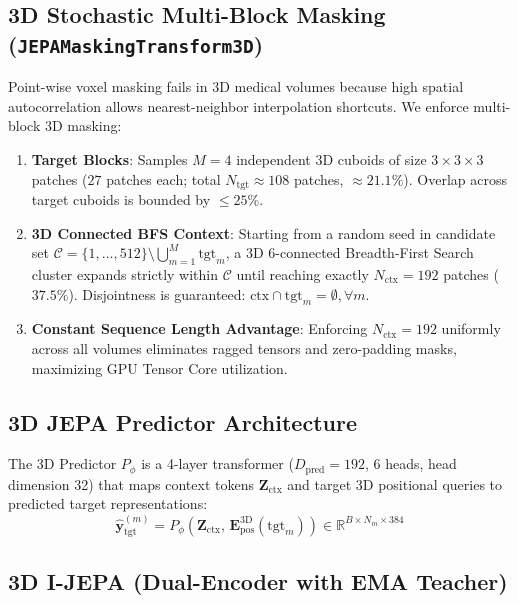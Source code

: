 \documentclass{article}
\begin{document}
\subsection{3D Stochastic Multi-Block Masking (\texttt{JEPAMaskingTransform3D})}

Point-wise voxel masking fails in 3D medical volumes because high spatial autocorrelation allows nearest-neighbor interpolation shortcuts. We enforce multi-block 3D masking:
\begin{enumerate}
    \item \textbf{Target Blocks}: Samples $M = 4$ independent 3D cuboids of size $3 \times 3 \times 3$ patches ($27$ patches each; total $N_{\text{tgt}} \approx 108$ patches, $\approx 21.1\%$). Overlap across target cuboids is bounded by $\le 25\%$.
    \item \textbf{3D Connected BFS Context}: Starting from a random seed in candidate set $\mathcal{C} = \{1, \dots, 512\} \setminus \bigcup_{m=1}^M \text{tgt}_m$, a 3D 6-connected Breadth-First Search cluster expands strictly within $\mathcal{C}$ until reaching exactly $N_{\text{ctx}} = 192$ patches ($37.5\%$). Disjointness is guaranteed: $\text{ctx} \cap \text{tgt}_m = \emptyset, \forall m$.
    \item \textbf{Constant Sequence Length Advantage}: Enforcing $N_{\text{ctx}} = 192$ uniformly across all volumes eliminates ragged tensors and zero-padding masks, maximizing GPU Tensor Core utilization.
\end{enumerate}

\subsection{3D JEPA Predictor Architecture}

The 3D Predictor $P_\phi$ is a 4-layer transformer ($D_{\text{pred}} = 192$, 6 heads, head dimension 32) that maps context tokens $\mathbf{Z}_{\text{ctx}}$ and target 3D positional queries to predicted target representations:
\begin{equation}
    \hat{\mathbf{y}}_{\text{tgt}}^{(m)} = P_\phi\left(\mathbf{Z}_{\text{ctx}}, \, \mathbf{E}_{\text{pos}}^{3\text{D}}(\text{tgt}_m)\right) \in \mathbb{R}^{B \times N_m \times 384}
\end{equation}

\subsection{3D I-JEPA (Dual-Encoder with EMA Teacher)}
\end{document}
